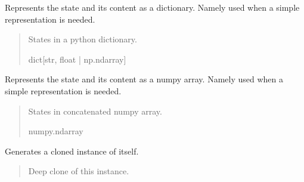 \documentclass[letterpaper,10pt,english]{sphinxmanual}
\begin{document}
\begin{fulllineitems}
\begin{fulllineitems}
\label{\detokenize{modules/estimation/state:qnav.estimation.state.EstimatedState.as_dict}}
\pysigstartsignatures
{}
\pysigstopsignatures
\sphinxAtStartPar
Represents the state and its content as a dictionary.
Namely used when a simple representation is needed.
\begin{quote}\begin{description}
\sphinxAtStartPar
States in a python dictionary.

\sphinxAtStartPar
dict{[}str, float | np.ndarray{]}

\end{description}\end{quote}

\end{fulllineitems}


\begin{fulllineitems}
\label{\detokenize{modules/estimation/state:qnav.estimation.state.EstimatedState.as_numpy}}
\pysigstartsignatures
{}
\pysigstopsignatures
\sphinxAtStartPar
Represents the state and its content as a numpy array.
Namely used when a simple representation is needed.
\begin{quote}\begin{description}
\sphinxAtStartPar
States in concatenated numpy array.

\sphinxAtStartPar
numpy.ndarray

\end{description}\end{quote}

\end{fulllineitems}


\begin{fulllineitems}
\label{\detokenize{modules/estimation/state:qnav.estimation.state.EstimatedState.clone}}
\pysigstartsignatures
{}
\pysigstopsignatures
\sphinxAtStartPar
Generates a cloned instance of itself.
\begin{quote}\begin{description}
\sphinxAtStartPar
Deep clone of this instance.


\end{description}
\end{quote}
\end{fulllineitems}
\end{fulllineitems}
\end{document}
